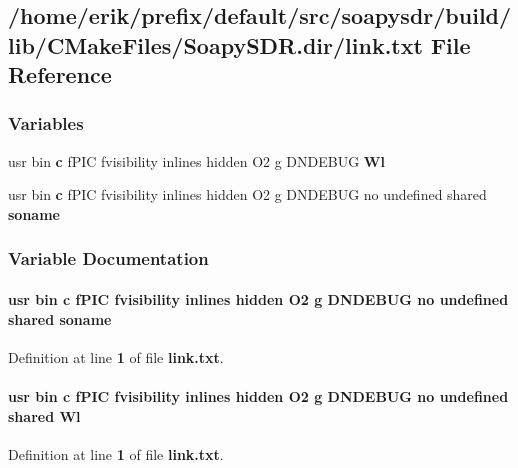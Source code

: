 \subsection{/home/erik/prefix/default/src/soapysdr/build/lib/\+C\+Make\+Files/\+Soapy\+S\+DR.dir/link.txt File Reference}
\label{soapysdr_2build_2lib_2CMakeFiles_2SoapySDR_8dir_2link_8txt}
\subsubsection*{Variables}
\begin{DoxyCompactItemize}
\item 
usr bin {\bf c} f\+P\+IC fvisibility inlines hidden O2 g D\+N\+D\+E\+B\+UG {\bf Wl}
\item 
usr bin {\bf c} f\+P\+IC fvisibility inlines hidden O2 g D\+N\+D\+E\+B\+UG no undefined shared {\bf soname}
\end{DoxyCompactItemize}


\subsubsection{Variable Documentation}
\paragraph[{soname}]{\setlength{\rightskip}{0pt plus 5cm}usr bin {\bf c} f\+P\+IC fvisibility inlines hidden O2 g D\+N\+D\+E\+B\+UG no undefined shared soname}\label{soapysdr_2build_2lib_2CMakeFiles_2SoapySDR_8dir_2link_8txt_ac8ce4830ca0ed3a762b15b660cb91f2e}


Definition at line {\bf 1} of file {\bf link.\+txt}.

\paragraph[{Wl}]{\setlength{\rightskip}{0pt plus 5cm}usr bin {\bf c} f\+P\+IC fvisibility inlines hidden O2 g D\+N\+D\+E\+B\+UG no undefined shared Wl}\label{soapysdr_2build_2lib_2CMakeFiles_2SoapySDR_8dir_2link_8txt_aa0c88405c3a1ac310dfe4bf9c6e71454}


Definition at line {\bf 1} of file {\bf link.\+txt}.

